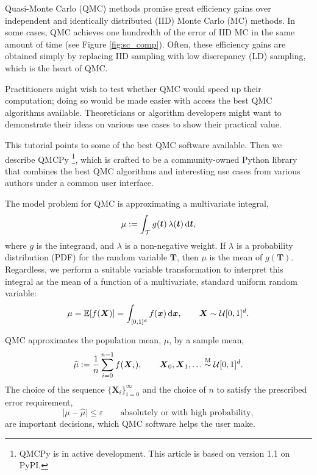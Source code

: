 \documentclass[graybox]{svmult}
\begin{document}
Quasi-Monte Carlo (QMC) methods promise great efficiency gains over independent and identically distributed (IID) Monte Carlo (MC) methods.  In some cases, QMC  achieves one hundredth of the error of IID MC in the same amount of time (see Figure \ref{fig:sc_comp}). Often, these efficiency gains are obtained simply by replacing IID sampling with low discrepancy (LD) sampling, which is the heart of QMC. 

Practitioners might wish to test whether QMC would speed up their computation; doing so would be made easier with access the best QMC algorithms available.  Theoreticians or algorithm developers might want to demonstrate their ideas on various use cases to show their practical value.  

This tutorial points to some of the best QMC software available.  Then we describe  QMCPy \cite{QMCPy2020a}\footnote{QMCPy is in active development. This article is based on version 1.1 on PyPI.}, which is crafted to be a community-owned Python library that combines the best QMC algorithms and interesting use cases from various authors under a common user interface.

The model problem for QMC is approximating a multivariate integral,
\begin{equation} \label{eq:integral}
	\mu := \int_\mathcal{T} g(\boldsymbol{t}) \, \lambda(\boldsymbol{t}) \, \D \boldsymbol{t},
\end{equation}
where $g$ is the integrand, and $\lambda$ is a non-negative weight.  If $\lambda$ is a probability distribution (PDF) for the random variable $\boldsymbol{T}$, then $\mu$ is the mean of $g(\boldsymbol{T})$.  Regardless, we perform a suitable variable transformation to interpret this integral as the  mean of a function of a multivariate, standard uniform random variable:
\begin{equation} \label{eq:fintegral}
	\mu = \mathbb{E}[f(\boldsymbol{X})] =  \int_{[0,1]^d}  f(\boldsymbol{x}) \,  \D \boldsymbol{x} , \qquad \boldsymbol{X} \sim \mathcal{U}[0,1]^d.
\end{equation}

QMC approximates the population mean, $\mu$,  by a sample mean,
\begin{equation} \label{eq:samplemean}
	\widehat{\mu} := \frac 1n \sum_{i=0}^{n-1} f(\boldsymbol{X}_i), \qquad \boldsymbol{X}_0, \boldsymbol{X}_1, \ldots \overset{\textup{M}}{\sim} \mathcal{U}[0,1]^d.
\end{equation}
The choice of the sequence $\{\boldsymbol{X}_i\}_{i=0}^\infty$ and the choice of $n$ to satisfy  the prescribed error requirement,
\begin{equation} \label{eq:err_req}
	\lvert\mu - \widehat{\mu}\rvert \le \varepsilon \qquad \text{absolutely or with high probability},
\end{equation} 
are important decisions, which  QMC software helps the user make.
\end{document}
